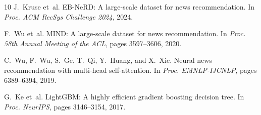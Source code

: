 \documentclass[11pt,a4paper]{article}
\begin{document}

\begin{thebibliography}{10}
\small
\setlength{\itemsep}{0pt}
\setlength{\parsep}{0pt}
J.~Kruse et~al.
\newblock EB-NeRD: A large-scale dataset for news recommendation.
\newblock In \emph{Proc. ACM RecSys Challenge 2024}, 2024.

F.~Wu et~al.
\newblock MIND: A large-scale dataset for news recommendation.
\newblock In \emph{Proc. 58th Annual Meeting of the ACL}, pages 3597--3606, 2020.

C.~Wu, F.~Wu, S.~Ge, T.~Qi, Y.~Huang, and X.~Xie.
\newblock Neural news recommendation with multi-head self-attention.
\newblock In \emph{Proc. EMNLP-IJCNLP}, pages 6389--6394, 2019.

G.~Ke et~al.
\newblock LightGBM: A highly efficient gradient boosting decision tree.
\newblock In \emph{Proc. NeurIPS}, pages 3146--3154, 2017.
\end{thebibliography}
\end{document}
